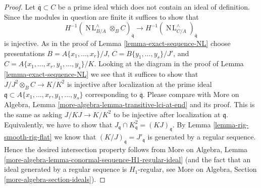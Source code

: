 \documentclass[10pt,a4paper]{amsart}
\theoremstyle{plain}
\theoremstyle{definition}
\theoremstyle{remark}
\numberwithin{equation}{subsection}
\def\NL{\mathop{N\!L}\nolimits}
\begin{document}
\begin{proof}
Let $\overline{\mathfrak q} \subset C$ be a prime ideal which does not contain
an ideal of definition. Since the modules in question are finite
it suffices to show that
$$
H^{-1}(\NL_{B/A}^\wedge \otimes_B C)_{\overline{\mathfrak q}} \to
H^{-1}(\NL_{C/A}^\wedge)_{\overline{\mathfrak q}}
$$
is injective. As in the proof of Lemma \ref{lemma-exact-sequence-NL}
choose presentations $B = A\{x_1, \ldots, x_r\}/J$,
$C = B\{y_1, \ldots, y_s\}/J'$, and
$C = A\{x_1, \ldots, x_r, y_1, \ldots, y_s\}/K$.
Looking at the diagram in the proof of Lemma \ref{lemma-exact-sequence-NL}
we see that it suffices to show that $J/J^2 \otimes_B C \to K/K^2$
is injective after localization at the prime ideal
$\mathfrak q \subset A\{x_1, \ldots, x_r, y_1, \ldots, y_s\}$
corresponding to $\overline{\mathfrak q}$. Please compare with
More on Algebra, Lemma \ref{more-algebra-lemma-transitive-lci-at-end}
and its proof. This is the same as 
asking $J/KJ \to K/K^2$ to be injective after localization
at $\mathfrak q$. Equivalently, we have to show that
$J_\mathfrak q \cap K^2_\mathfrak q = (KJ)_\mathfrak q$.
By Lemma \ref{lemma-rig-smooth-rig-flat}
we know that $(K/J)_\mathfrak q = J'_\mathfrak q$
is generated by a regular sequence.
Hence the desired intersection property follows from
More on Algebra, Lemma
\ref{more-algebra-lemma-conormal-sequence-H1-regular-ideal}
(and the fact that an ideal generated by a regular sequence
is $H_1$-regular, see
More on Algebra, Section \ref{more-algebra-section-ideals}).
\end{proof}
\end{document}
